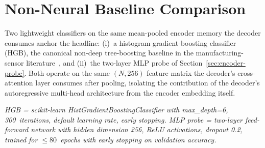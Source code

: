 \documentclass[sensors,article,submit,moreauthors,pdftex]{Definitions/mdpi}
\begin{document}


\clearpage
\section{Non-Neural Baseline Comparison}
\label{app:baselines}
Two lightweight classifiers on the same mean-pooled encoder memory the decoder consumes anchor the headline: (i)~a histogram gradient-boosting classifier (HGB), the canonical non-deep tree-boosting baseline in the manufacturing-sensor literature~\cite{chen2016xgboost,janssens2016convolutional,stathatos2024cnn}, and (ii)~the two-layer MLP probe of Section~\ref{sec:encoder-probe}. Both operate on the same $(N,256)$ feature matrix the decoder's cross-attention layer consumes after pooling, isolating the contribution of the decoder's autoregressive multi-head architecture from the encoder embedding itself.

\begin{table}[ht]
\centering
\caption{Non-neural / lightweight baselines on the same mean-pooled encoder embedding the decoder consumes. The decoder's headline numbers appear in Table~\ref{tab:headline}.}
\label{tab:baselines}
\small
{}
\par\smallskip
\textit{HGB = scikit-learn HistGradientBoostingClassifier with max\_depth=6, 300~iterations, default learning rate, early stopping. MLP probe = two-layer feed-forward network with hidden dimension 256, ReLU activations, dropout 0.2, trained for $\le 80$~epochs with early stopping on validation accuracy.}
\end{table}
\end{document}
